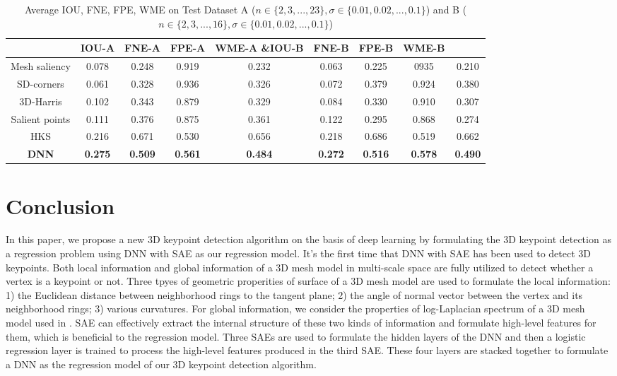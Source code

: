 \documentclass[runningheads]{article}
\begin{document}
\begin{table}[!htb]  
	\centering
	\renewcommand\arraystretch{1.2}
	\caption{Average IOU, FNE, FPE, WME on Test Dataset A (\emph{$n \in \{2,3,...,23\}, \sigma \in \{0.01,0.02,...,0.1\}$}) and B (\emph{$n \in \{2,3,...,16\}, \sigma \in \{0.01,0.02,...,0.1\}$})}
	\begin{tabular}{ccccccccc}  %
		\hline
		\cline{1-9}
		&IOU-A  &FNE-A  &FPE-A  &WME-A               \&IOU-B &FNE-B &FPE-B &WME-B \\ \hline  %
		Mesh saliency &0.078 &0.248 &0.919 &0.232                &0.063 &0.225 &0935 &0.210\\        
		SD-corners &0.061 &0.328 &0.936 &0.326                   &0.072 &0.379 &0.924 &0.380\\        
		3D-Harris &0.102 &0.343 &0.879 &0.329                    &0.084 &0.330 &0.910 &0.307\\        
		Salient points &0.111 &0.376 &0.875 &0.361               &0.122 &0.295 &0.868 &0.274\\
		HKS &0.216 &0.671 &0.530 &0.656                          &0.218 &0.686 &0.519 &0.662\\
		\textbf{DNN} &\textbf{0.275} &\textbf{0.509} &\textbf{0.561} &\textbf{0.484}                          &\textbf{0.272} &\textbf{0.516} &\textbf{0.578} &\textbf{0.490}\\
		\hline
		\cline{1-9}
	\end{tabular}
\end{table}

\section{Conclusion}
In this paper, we propose a new 3D keypoint detection algorithm on the basis of deep learning by formulating the 3D keypoint detection as a regression problem using DNN with SAE as our regression model. It's the first time that DNN with SAE has been used to detect 3D keypoints. Both local information and global information of a 3D mesh model in multi-scale space are fully utilized to detect whether a vertex is a keypoint or not. Three tpyes of geometric properities of surface of a 3D mesh model are used to formulate the local information: 1) the Euclidean distance between neighborhood rings to the tangent plane; 2) the angle of normal vector between the vertex and its neighborhood rings; 3) various curvatures. For global information, we consider the properties of log-Laplacian spectrum of a 3D mesh model used in \cite{song2014mesh}. SAE can effectively extract the internal structure of these two kinds of information and formulate high-level features for them, which is beneficial to the regression model. Three SAEs are used to formulate the hidden layers of the DNN and then a logistic regression layer is trained to process the high-level features produced in the third SAE. These four layers are stacked together to formulate a DNN as the regression model of our 3D keypoint detection algorithm. 
\end{document}
